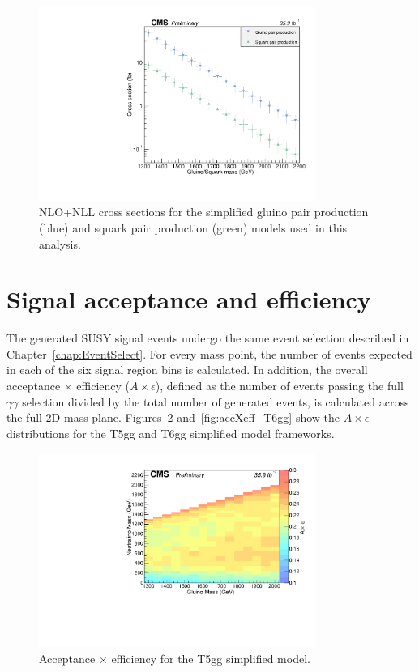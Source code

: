 \begin{figure}[htbp]
    \centering
    \includegraphics[width=0.8\textwidth]{Figures/Results/xSecPlot.pdf}
    \caption[NLO+NLL cross sections for the simplified gluino pair production
    and squark pair production models used in this analysis.]
    {NLO+NLL cross sections for the simplified gluino pair production (blue)
    and squark pair production (green) models used in this analysis.}
    \label{fig:xSec}
\end{figure}


\section{Signal acceptance and efficiency}
The generated SUSY signal events undergo the same event selection described in Chapter~\ref{chap:EventSelect}. 
For every mass point, the number of events expected in each of the six signal region bins is calculated. 
In addition, the overall acceptance $\times$ efficiency ($A \times \epsilon$), defined as the number of events
passing the full $\gamma\gamma$ selection divided by the total number of generated events, is calculated across the 
full 2D mass plane. Figures~\ref{fig:accXeff_T5gg} and~\ref{fig:accXeff_T6gg} show the $A \times \epsilon$ distributions for the T5gg and T6gg simplified model 
frameworks.

\begin{figure}[h]
\begin{center}
\includegraphics[width=0.8\textwidth]{Figures/Results/accXeff_T5gg.pdf}
\end{center}
    \caption{Acceptance $\times$ efficiency for the T5gg simplified model.}
    \label{fig:accXeff_T5gg}
\end{figure}

